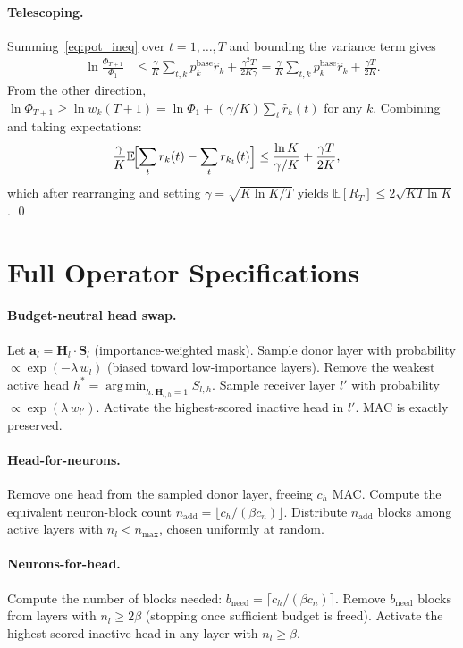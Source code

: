 \documentclass{article}
\newcommand{\Hb}{\mathbf{H}}
\newcommand{\Sb}{\mathbf{S}}
\newcommand{\E}{\mathbb{E}}
\newcommand{\argmin}{\mathop{\mathrm{arg\,min}}}
\begin{document}
\paragraph{Telescoping.}
Summing~\eqref{eq:pot_ineq} over $t=1,\ldots,T$ and bounding the
variance term gives
\begin{align}
  \ln\!\frac{\Phi_{T+1}}{\Phi_1}
  &\le \frac{\gamma}{K}\sum_{t,k}p^{\mathrm{base}}_k\hat{r}_k
     + \frac{\gamma^2 T}{2K\gamma}
  = \frac{\gamma}{K}\sum_{t,k}p^{\mathrm{base}}_k\hat{r}_k
     + \frac{\gamma T}{2K}.
\end{align}
From the other direction,
$\ln\Phi_{T+1}\ge\ln w_k(T+1) = \ln\Phi_1 + (\gamma/K)\sum_t\hat{r}_k(t)$
for any $k$.  Combining and taking expectations:
\begin{align}
  \frac{\gamma}{K}\E\!\Bigl[\sum_t r_k(t) - \sum_t r_{k_t}(t)\Bigr]
  &\le \frac{\ln K}{\gamma/K} + \frac{\gamma T}{2K},
\end{align}
which after rearranging and setting $\gamma=\sqrt{K\ln K/T}$ yields
$\E[R_T]\le 2\sqrt{KT\ln K}$. \qed

\section{Full Operator Specifications}
\label{app:operators}

\paragraph{Budget-neutral head swap.}
Let $\bm{a}_l = \Hb_l \cdot \Sb_l$ (importance-weighted mask).
Sample donor layer with probability $\propto\exp(-\lambda\, w_l)$
(biased toward low-importance layers).  Remove the weakest active head
$h^* = \argmin_{h:\Hb_{l,h}=1} S_{l,h}$.  Sample receiver layer $l'$
with probability $\propto\exp(\lambda\, w_{l'})$.  Activate the
highest-scored inactive head in $l'$.  MAC is exactly preserved.

\paragraph{Head-for-neurons.}
Remove one head from the sampled donor layer, freeing $c_h$ MAC.
Compute the equivalent neuron-block count
$n_{\mathrm{add}} = \lfloor c_h / (\beta c_n)\rfloor$.
Distribute $n_{\mathrm{add}}$ blocks among active layers
with $n_l < n_{\max}$, chosen uniformly at random.

\paragraph{Neurons-for-head.}
Compute the number of blocks needed:
$b_{\mathrm{need}} = \lceil c_h/(\beta c_n)\rceil$.
Remove $b_{\mathrm{need}}$ blocks from layers with $n_l\ge 2\beta$
(stopping once sufficient budget is freed).  Activate the
highest-scored inactive head in any layer with $n_l\ge\beta$.
\end{document}
